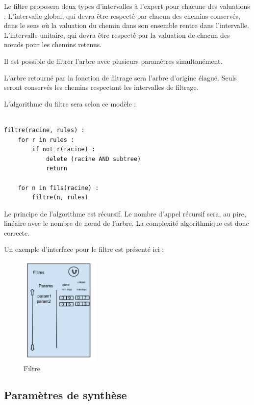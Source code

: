 		Le filtre proposera deux types d'intervalles à l'expert pour chacune des valuations :
		L'intervalle global, qui devra être respecté par chacun des chemins conservés, dans le sens où la valuation du chemin dans son ensemble rentre dans l'intervalle.
		L'intervalle unitaire, qui devra être respecté par la valuation de chacun des nœuds pour les chemins retenus.

		Il est possible de filtrer l'arbre avec plusieurs paramètres simultanément.
		
		L'arbre retourné par la fonction de filtrage sera l'arbre d'origine élagué. Seuls seront conservés les chemins respectant les intervalles de filtrage.
		
		L'algorithme du filtre sera selon ce modèle :

		\begin{lstlisting}

filtre(racine, rules) :
	for r in rules :
		if not r(racine) :
			delete (racine AND subtree)
			return

	for n in fils(racine) :
		filtre(n, rules)

\end{lstlisting}
	
		Le principe de l'algorithme est récursif.
		Le nombre d'appel récursif sera, au pire, linéaire avec le nombre de nœud de l'arbre.
		La complexité algorithmique est donc correcte.

		Un exemple d'interface pour le filtre est présenté ici :

		\begin{figure}[h!]
			\begin{center}
				\includegraphics[width=0.35\textwidth]{figure/filtre.png}
			\end{center}
			\caption{Filtre}
			\label{fig:filtre}
		\end{figure}

\subsection{Paramètres de synthèse}

